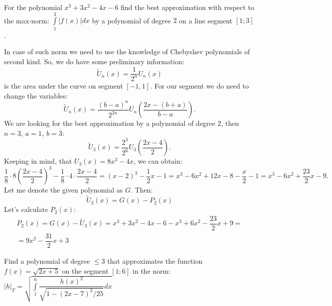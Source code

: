 \documentclass[12pt]{report}
\begin{document}
\begin{problem}{}
    For the polynomial $x^3 + 3x^2 - 4x - 6$ find the best approximation with respect to the max-norm: $\displaystyle \int\limits_1^3 |f(x)|dx$ by a polynomial of degree $2$ on a line segment $[1;3]$.
\end{problem}

\begin{solution}
    In case of such norm we need to use the knowledge of Chebyshev polynomials of second kind. So, we do have some preliminary information:
    \[
         \tilde{U}_n (x) = \dfrac{1}{2^n} U_n(x) 
    \]
    is the area under the curve on segment $[-1, 1]$. For our segment we do need to change the variables:
    \[
         \tilde{U}_n (x) = \dfrac{(b-a)^n}{2^{2n}} U_n \left(\dfrac{2x - (b+a)}{b-a}\right).
    \]
    We are looking for the best approximation by a polynomial of degree $2$, then $n = 3$, $a = 1, \ b = 3$:
    \[
         \tilde{U}_3(x) = \dfrac{2^3}{2^6} U_3 \left(\dfrac{2x - 4}{2}\right).
    \]
    Keeping in mind, that $U_3(x) = 8x^3 - 4x$, we can obtain:
    \[
         \dfrac{1}{8} \cdot 8 \left(\dfrac{2x-4}{2}\right)^3 - \dfrac{1}{8} \cdot 4 \cdot \dfrac{2x-4}{2} = (x-2)^3 - \dfrac{1}{2} x - 1 = x^3 - 6x^2 + 12x - 8 - \dfrac{x}{2} - 1 = x^3 - 6x^2 + \dfrac{23}{2} x - 9.
    \]
    Let me denote the given polynomial as $G$. Then:
    \[
         \tilde{U}_3(x) = G(x) - P_2(x)
    \]
    Let's calculate $P_2(x)$:
    \[
      \begin{array}{c}
         \displaystyle P_2(x) = G(x) - \tilde{U}_3(x) = x^3 + 3x^2 - 4x - 6 - x^3 + 6x^2 - \dfrac{23}{2}x + 9 = 
         \\
         \displaystyle = 9x^2 - \dfrac{31}{2}x + 3
      \end{array}
    \]
\end{solution}

\begin{problem}{}
    Find a polynomial of degree $\leq 3$ that approximates the function $f(x) = \sqrt{2x+5}$ on the segment $[1;6]$ in the norm: $\displaystyle |h|_T = \sqrt{\int\limits_{1}^6 \dfrac{h(x)^2}{\sqrt{1 - (2x-7)^2/25}}dx}
    $
\end{problem}
\end{document}
